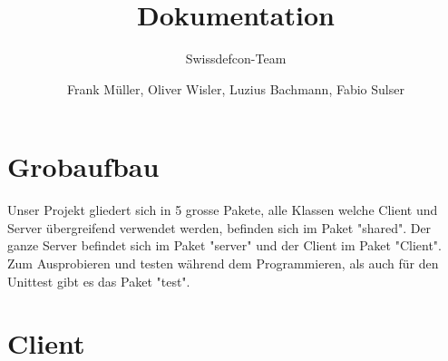 \documentclass[ngerman, 12pt, pdftex]{scrartcl}[2006/07/30]
\title{Dokumentation}
\author{Frank M\"{u}ller, Oliver Wisler, Luzius Bachmann, Fabio Sulser}
\subtitle{Swissdefcon-Team}
\begin{document}
\pagestyle{fancy}
\fancyhf{} 
\fancyhead[R]{\thepage}  %
\renewcommand{\headrulewidth}{0.1pt} 	%



\maketitle


\newpage

\tableofcontents

\newpage

\section{Grobaufbau}
Unser Projekt gliedert sich in 5 grosse Pakete, alle Klassen welche Client und Server übergreifend verwendet werden, 
befinden sich im Paket "shared". Der ganze Server befindet sich im Paket "server" und der Client im Paket "Client".
Zum Ausprobieren und testen während dem Programmieren, als auch für den Unittest gibt es das Paket "test".

\section{Client}
\end{document}
